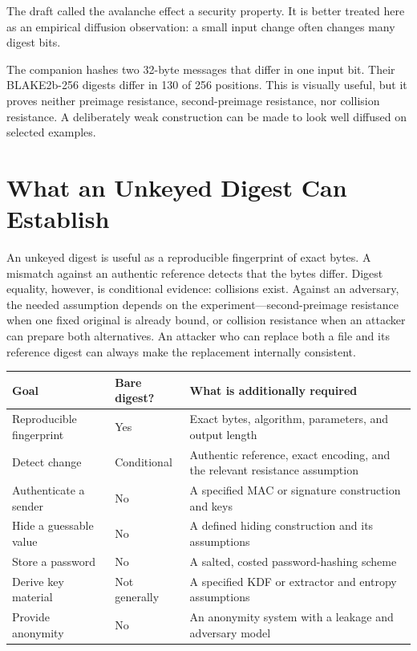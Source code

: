 The draft called the avalanche effect a security property. It is better treated
here as an empirical diffusion observation: a small input change often changes
many digest bits.

The companion hashes two 32-byte messages that differ in one input bit. Their
BLAKE2b-256 digests differ in 130 of 256 positions. This is visually useful,
but it proves neither preimage resistance, second-preimage resistance, nor
collision resistance. A deliberately weak construction can be made to look
well diffused on selected examples.

\section{What an Unkeyed Digest Can Establish}

An unkeyed digest is useful as a reproducible fingerprint of exact bytes. A
mismatch against an authentic reference detects that the bytes differ. Digest
equality, however, is conditional evidence: collisions exist. Against an
adversary, the needed assumption depends on the experiment---second-preimage
resistance when one fixed original is already bound, or collision resistance
when an attacker can prepare both alternatives. An attacker who can replace
both a file and its reference digest can always make the replacement internally
consistent.

\begin{center}
\small
\begin{tabular}{|>{\raggedright\arraybackslash}p{}|>{\centering\arraybackslash}p{}|>{\raggedright\arraybackslash}p{}|}
\hline
Goal & Bare digest? & What is additionally required \\
\hline
Reproducible fingerprint & Yes & Exact bytes, algorithm, parameters, and output length \\
\hline
Detect change & Conditional & Authentic reference, exact encoding, and the relevant resistance assumption \\
\hline
Authenticate a sender & No & A specified MAC or signature construction and keys \\
\hline
Hide a guessable value & No & A defined hiding construction and its assumptions \\
\hline
Store a password & No & A salted, costed password-hashing scheme \\
\hline
Derive key material & Not generally & A specified KDF or extractor and entropy assumptions \\
\hline
Provide anonymity & No & An anonymity system with a leakage and adversary model \\
\hline
\end{tabular}
\end{center}


